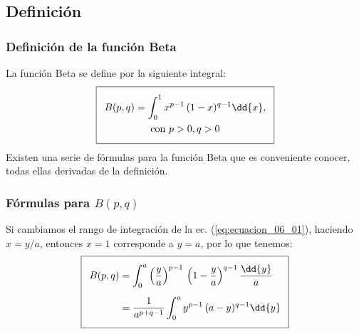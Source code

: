 \subsection{Definición}
\begin{frame}[fragile]
\frametitle{Definición de la función Beta}
La función Beta se define por la siguiente integral:
\begin{align} \addtolength{\fboxsep}{5pt}\boxed{
\begin{gathered}
B(p, q) = \int_{0}^{1} x^{p-1} \, (1- x )^{q-1} \dd{x}, \\
\mbox{con }  p > 0, q > 0
\end{gathered}
}
\label{eq:ecuacion_06_01}
\end{align}
\pause
Existen una serie de fórmulas para la función Beta que es conveniente conocer, todas ellas derivadas de la definición.
\end{frame}
\begin{frame}
\frametitle{Fórmulas para $B(p, q)$}
Si cambiamos el rango de integración de la ec. (\ref{eq:ecuacion_06_01}), haciendo $x = y/a$, entonces $x = 1$ corresponde a $y = a$, por lo que tenemos:
\begin{align} \addtolength{\fboxsep}{5pt}\boxed{
\begin{aligned}
B (p, q) &= \int_{0}^{a} \left( \dfrac{y}{a}\right)^{p-1} \, \left( 1 - \dfrac{y}{a}\right)^{q-1} \dfrac{\dd{y}}{a} \\[0.5em]
&= \dfrac{1}{a^{p+q-1}} \int_{0}^{a} y^{p-1} \, (a - y)^{q-1} \dd{y}
\end{aligned}
\label{eq:ecuacion_06_03}
}
\end{align}
\end{frame}
